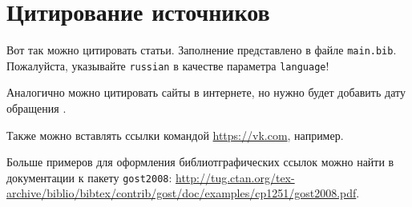 \section{Цитирование источников}

Вот так \cite{Article} можно цитировать статьи. Заполнение представлено в файле \texttt{main.bib}. Пожалуйста, указывайте \texttt{russian} в качестве параметра \texttt{language}!

Аналогично можно цитировать сайты в интернете, но нужно будет добавить дату обращения \cite{Wikipedia}.

Также можно вставлять ссылки командой \url{https://vk.com}, например.

Больше примеров для оформления библиотграфических ссылок можно найти в документации к пакету \texttt{gost2008}: \url{http://tug.ctan.org/tex-archive/biblio/bibtex/contrib/gost/doc/examples/cp1251/gost2008.pdf}.